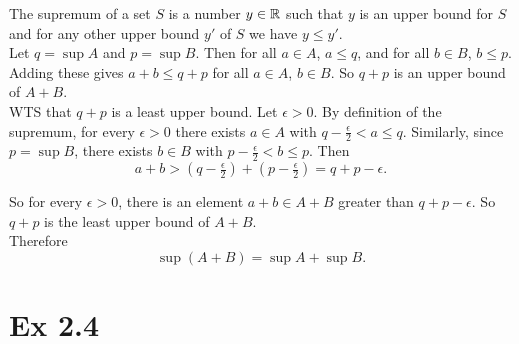 \documentclass{report}
\begin{document}
\begin{proofWithHibiscus}
  The supremum of a set $S$ is a number $y \in \mathbb{R}$ such that $y$ is an upper bound for $S$ and for any other upper bound $y'$ of $S$ we have $y \leq y'$. \\

  Let $q = \sup A$ and $p = \sup B$. Then for all $a \in A$, $a \leq q$, and for all $b \in B$, $b \leq p$. Adding these gives $a+b \leq q+p$ for all $a \in A$, $b \in B$. So $q+p$ is an upper bound of $A+B$. \\

  WTS that $q + p$ is a least upper bound. Let $\epsilon > 0$.  
  By definition of the supremum, for every $\epsilon > 0$ there exists $a \in A$ with $q - \tfrac{\epsilon}{2} < a \leq q$.  
  Similarly, since $p = \sup B$, there exists $b \in B$ with $p - \tfrac{\epsilon}{2} < b \leq p$.  
  Then
  \[
    a+b > (q-\tfrac{\epsilon}{2}) + (p-\tfrac{\epsilon}{2}) = q+p - \epsilon.
  \]
  
  So for every $\epsilon > 0$, there is an element $a+b \in A+B$ greater than $q+p - \epsilon$. So $q+p$ is the least upper bound of $A+B$. \\

  Therefore
  \[
    \sup(A+B) = \sup A + \sup B.
  \]
\end{proofWithHibiscus}



\newpage

\section*{Ex 2.4}

\end{document}
